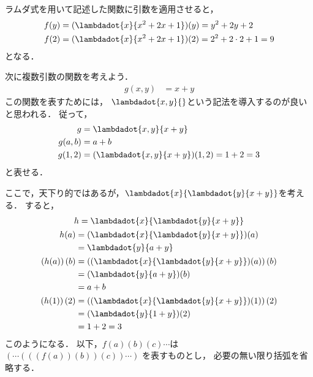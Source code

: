 \documentclass[a4paper,titlepage,report]{jsbook}
\begin{document}
ラムダ式を用いて記述した関数に引数を適用させると，
\begin{align}
f(y) &= (\lambdadot{x}{x^2 + 2x + 1})(y) = y^2 + 2y + 2 \\
f(2) &= (\lambdadot{x}{x^2 + 2x + 1})(2) = 2^2 + 2\cdot 2 + 1 = 9
\end{align}
となる．

次に複数引数の関数を考えよう．
\begin{align}
g(x, y) &= x + y
\end{align}
この関数を表すためには，
$\lambdadot{x,y}{}$という記法を導入するのが良いと思われる．
従って，
\begin{align}
\label{eq:lambda-multiple}
g &= \lambdadot{x,y}{x + y}\\
\label{eq:lambda-multiple-inst}
g(a, b) &= a + b\\
g(1, 2) &= (\lambdadot{x,y}{x + y})(1, 2) = 1 + 2 = 3
\end{align}
と表せる．

ここで，天下り的ではあるが，$\lambdadot{x}{\lambdadot{y}{x+y}}$を考える．
すると，
\begin{gather}
\begin{aligned}
\label{eq:lambda-curried}
h &= \lambdadot{x}{\lambdadot{y}{x+y}} \\
\end{aligned} \\
\begin{aligned}
\label{eq:lambda-curried-partial}
h(a) &= (\lambdadot{x}{\lambdadot{y}{x+y}})(a)\\
     &= {\lambdadot{y}{a+y}}
\end{aligned} \\
\begin{aligned}
\label{eq:lambda-curried-inst}
\left(h(a)\right)(b) &= \left((\lambdadot{x}{\lambdadot{y}{x+y}})(a)\right)(b) \\
        &= (\lambdadot{y}{a+y})(b)\\
        &= a + b
\end{aligned} \\
\begin{aligned}
\left(h(1)\right)(2) &= \left((\lambdadot{x}{\lambdadot{y}{x+y}})(1)\right)(2) \\
        &= (\lambdadot{y}{1+y})(2) \\
        &= 1 + 2 = 3
\end{aligned}
\end{gather}
このようになる．
以下，$f(a)(b)(c)\cdots$は
$\left({\cdots\left({\left({\left({f(a)}\right)(b)}\right)(c)}\right)\cdots}\right)$
を表すものとし，
必要の無い限り括弧を省略する．
\end{document}
